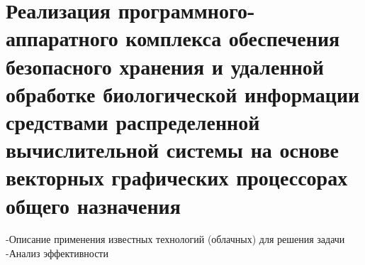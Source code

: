 \chapter{Реализация программного-аппаратного комплекса обеспечения безопасного хранения и удаленной обработке биологической информации средствами распределенной вычислительной системы на основе векторных графических процессорах общего назначения}
-Описание применения известных технологий (облачных) для решения задачи
-Анализ эффективности
